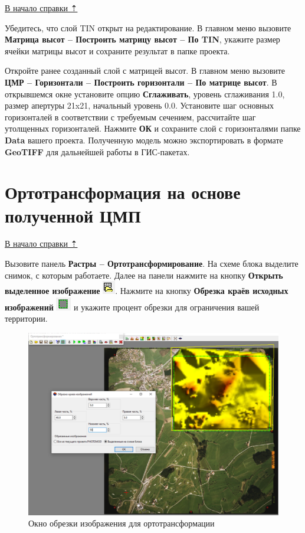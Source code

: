 \documentclass[
  12pt,
]{book}
\begin{document}
\protect\hyperlink{photomod_DEM}{В начало справки ⇡}

Убедитесь, что слой TIN открыт на редактирование. В главном меню вызовите \textbf{Матрица высот -- Построить матрицу высот -- По TIN}, укажите размер ячейки матрицы высот и сохраните результат в папке проекта.

Откройте ранее созданный слой с матрицей высот. В главном меню вызовите \textbf{ЦМР -- Горизонтали -- Построить горизонтали -- По матрице высот}. В открывшемся окне установите опцию \textbf{Сглаживать}, уровень сглаживания 1.0, размер апертуры 21x21, начальный уровень 0.0. Установите шаг основных горизонталей в соответствии с требуемым сечением, рассчитайте шаг утолщенных горизонталей. Нажмите \textbf{ОК} и сохраните слой с горизонталями папке \textbf{Data} вашего проекта. Полученную модель можно экспортировать в формате \textbf{GeoTIFF} для дальнейшей работы в ГИС-пакетах.

\hypertarget{photomod_DEM-Orthorectification}{%
\section{Ортотрансформация на основе полученной ЦМП}\label{photomod_DEM-Orthorectification}}

\protect\hyperlink{photomod_DEM}{В начало справки ⇡}

Вызовите панель \textbf{Растры -- Ортотрансформирование}. На схеме блока выделите снимок, с которым работаете. Далее на панели нажмите на кнопку \textbf{Открыть выделенное изображение} \includegraphics{images/Ref16/Select.png}. Нажмите на кнопку \textbf{Обрезка краёв исходных изображений} \includegraphics{images/Ref16/Clip2.png} и укажите процент обрезки для ограничения вашей территории.

\begin{figure}
\centering
\includegraphics{images/Ref16/Clip.png}
\caption{Окно обрезки изображения для ортотрансформации}
\end{figure}
\end{document}
